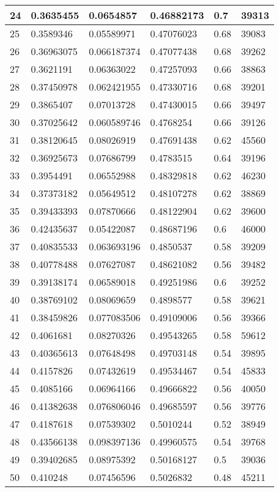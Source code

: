 \begin{longtable}{|l|l|l|l|l|l|}
24 & 0.3635455 & 0.0654857 & 0.46882173 & 0.7 & 39313 \\ \hline 
25 & 0.3589346 & 0.05589971 & 0.47076023 & 0.68 & 39083 \\ \hline 
26 & 0.36963075 & 0.066187374 & 0.47077438 & 0.68 & 39262 \\ \hline 
27 & 0.3621191 & 0.06363022 & 0.47257093 & 0.66 & 38863 \\ \hline 
28 & 0.37450978 & 0.062421955 & 0.47330716 & 0.68 & 39201 \\ \hline 
29 & 0.3865407 & 0.07013728 & 0.47430015 & 0.66 & 39497 \\ \hline 
30 & 0.37025642 & 0.060589746 & 0.4768254 & 0.66 & 39126 \\ \hline 
31 & 0.38120645 & 0.08026919 & 0.47691438 & 0.62 & 45560 \\ \hline 
32 & 0.36925673 & 0.07686799 & 0.4783515 & 0.64 & 39196 \\ \hline 
33 & 0.3954491 & 0.06552988 & 0.48329818 & 0.62 & 46230 \\ \hline 
34 & 0.37373182 & 0.05649512 & 0.48107278 & 0.62 & 38869 \\ \hline 
35 & 0.39433393 & 0.07870666 & 0.48122904 & 0.62 & 39600 \\ \hline 
36 & 0.42435637 & 0.05422087 & 0.48687196 & 0.6 & 46000 \\ \hline 
37 & 0.40835533 & 0.063693196 & 0.4850537 & 0.58 & 39209 \\ \hline 
38 & 0.40778488 & 0.07627087 & 0.48621082 & 0.56 & 39482 \\ \hline 
39 & 0.39138174 & 0.06589018 & 0.49251986 & 0.6 & 39252 \\ \hline 
40 & 0.38769102 & 0.08069659 & 0.4898577 & 0.58 & 39621 \\ \hline 
41 & 0.38459826 & 0.077083506 & 0.49109006 & 0.56 & 39366 \\ \hline 
42 & 0.4061681 & 0.08270326 & 0.49543265 & 0.58 & 59612 \\ \hline 
43 & 0.40365613 & 0.07648498 & 0.49703148 & 0.54 & 39895 \\ \hline 
44 & 0.4157826 & 0.07432619 & 0.49534467 & 0.54 & 45833 \\ \hline 
45 & 0.4085166 & 0.06964166 & 0.49666822 & 0.56 & 40050 \\ \hline 
46 & 0.41382638 & 0.076806046 & 0.49685597 & 0.56 & 39776 \\ \hline 
47 & 0.4187618 & 0.07539302 & 0.5010244 & 0.52 & 38949 \\ \hline 
48 & 0.43566138 & 0.098397136 & 0.49960575 & 0.54 & 39768 \\ \hline 
49 & 0.39402685 & 0.08975392 & 0.50168127 & 0.5 & 39036 \\ \hline 
50 & 0.410248 & 0.07456596 & 0.5026832 & 0.48 & 45211 \\ \hline 
\end{longtable}